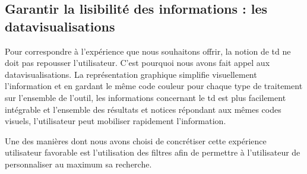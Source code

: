 \subsection{Garantir la lisibilité des informations : les datavisualisations}

Pour correspondre à l'expérience que nous souhaitons offrir, la notion de \gls{td} ne doit pas repousser l'utilisateur. C'est pourquoi nous avons fait appel aux datavisualisations. La représentation graphique simplifie visuellement l'information et en gardant le même code couleur pour chaque type de traitement sur l'ensemble de l'outil, les informations concernant le \gls{td} est plus facilement intégrable et l'ensemble des résultats et notices répondant aux mêmes codes visuels, l'utilisateur peut mobiliser rapidement l'information. 


Une des manières dont nous avons choisi de concrétiser cette expérience utilisateur favorable est l'utilisation des filtres afin de permettre à l'utilisateur de personnaliser au maximum sa recherche. 